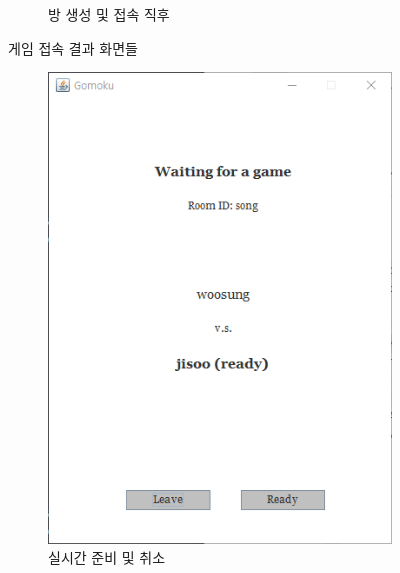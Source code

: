 \documentclass[a4paper, 10pt]{article}
\begin{document}
\begin{figure}[h]
\begin{subfigure}{.3\textwidth}
    \caption{방 생성 및 접속 직후}
    \label{fig:draw}
  \end{subfigure}
  \caption{게임 접속 결과 화면들}
\end{figure}
\newpage

\begin{figure}[h]
  \centering
  \begin{subfigure}{.3\textwidth}
    \centering
    \includegraphics[width=.9\linewidth]{resource/room}
    \caption{실시간 준비 및 취소}
    \label{fig:ready}
  \end{subfigure}
  \begin{subfigure}{.3\textwidth}
    \centering

\end{subfigure}
\end{figure}
\end{document}
